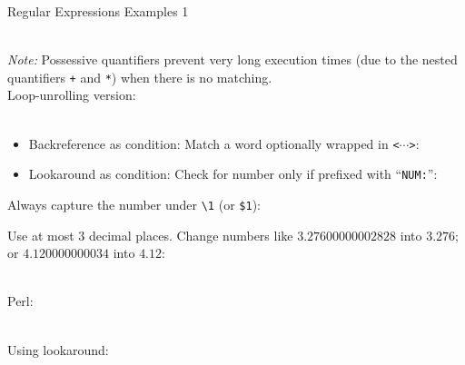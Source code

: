 \documentclass[11pt, a4paper, landscape]{scrartcl}
\newcommand{\regex}[1]{\texttt{#1}}
\newcommand{\cregex}[1]{\colorbox{gray!30}{\regex{#1}}}
\newcommand{\code}[1]{\texttt{#1}}
\newcommand{\bs}{\textbackslash}
\newcommand{\reshortexample}[1]{\cregex{}}
\newcommand{\relongexample}[1]{\regex{}}
\begin{document}
\begin{cheatsheet}{Regular Expressions Examples 1}

\begin{col1}


\reshortexample{./quoted_string.tex}\\
\emph{Note:} Possessive quantifiers prevent very long execution times (due to
the nested quantifiers \cregex{+} and \cregex{*}) when there is no matching.\\
Loop-unrolling version:\\
\reshortexample{./quoted_string_lu.tex}\\


\begin{itemize}
	\item Backreference as condition: Match a word optionally wrapped in \code{<$\cdots$>}:\\
	\reshortexample{./cond_backref.tex}
	\item Lookaround as condition: Check for number only if prefixed with ``\code{NUM:}'':\\
	\reshortexample{./cond_lookaround.tex}
\end{itemize}


Always capture the number under \cregex{\bs{}1} (or \cregex{\$1}):\\
\reshortexample{./branch_reset.tex}


Use at most $3$ decimal places. Change numbers like $3.27600000002828$ into
$3.276$; or $4.120000000034$ into $4.12$:\\
\reshortexample{./fixfloat.tex}\\

\end{col1}

\begin{col2}


Perl:\\
\relongexample{./extract_filename.tex}\\


Using lookaround:\\
\reshortexample{./thousandsep_1.tex}\\


\end{col2}
\end{cheatsheet}
\end{document}
